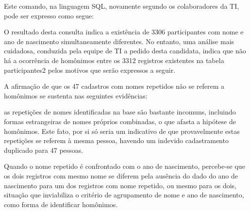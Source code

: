\documentclass[
12pt,		%
openright,	%
twoside,  %
a4paper,			%
chapter=TITLE,		%
english,			%
french,				%
spanish,			%
brazil				%
]{USPSC-classe/USPSC_RedarTex}
\begin{document}
\noindent\begin{center}\mbox{\centering{}}\end{center}


Este comando, na linguagem SQL, novamente segundo os colaboradores da TI, pode ser expresso como segue:











\noindent\begin{center}\mbox{\centering{}}\end{center}


O resultado desta consulta indica a exist\^encia de 3306 participantes com nome e ano de nascimento simultaneamente diferentes. No entanto, uma an\'alise mais cuidadosa, conduzida pela equipe de TI a pedido desta candidata, indica que n\~ao h\'a a ocorr\^encia de hom\^onimos entre os 3312 registros existentes na tabela  participantes2 pelos motivos que ser\~ao expressos a seguir.










A afirma\c{c}\~ao de que os 47 cadastros com nomes repetidos n\~ao se referem a hom\^onimos se sustenta nas seguintes evid\^encias:











\begin{alineas}
\item as repeti\c{c}\~oes de nomes identificadas na base s\~ao bastante incomuns, incluindo formas estrangeiras de nomes pr\'oprios combinadas, o que afasta a hip\'otese de hom\^onimos. Este fato, por si s\'o seria um indicativo de que provavelmente estas repeti\c{c}\~oes se referem \`a mesma pessoa, havendo um indevido cadastramento duplicado para 47 pessoas.
\item Quando o nome repetido \'e confrontado com o ano de nascimento, percebe-se que os dois registros com mesmo nome se diferem pela aus\^encia do dado do ano de nascimento para um dos registros com nome repetido, ou mesmo para os dois, situa\c{c}\~ao que inviabiliza o crit\'erio de agrupamento de nome e ano de nascimento, como forma de identificar hom\^onimos.
\end{alineas}
\end{document}
